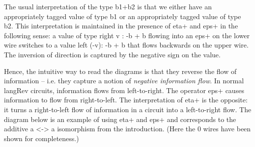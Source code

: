 \documentclass[preprint]{sigplanconf}
\begin{document}
The usual interpretation of the type {{b1+b2}} is that we either have an
appropriately tagged value of type {{b1}} or an appropriately tagged value of
type {{b2}}. This interpretation is maintained in the presence of {{eta+}}
and {{eps+}} in the following sense: a value of type {{right v : -b + b}}
flowing into an {{eps+}} on the lower wire switches to a value 
{{left (-v): -b + b}} that flows backwards on the upper wire. The inversion of
direction is captured by the negative sign on the value. 

\begin{multicols}{2}
\begin{center}
\end{center}
  
\begin{center}
\end{center}  
\end{multicols}

Hence, the intuitive way to read the diagrams is that they reverse the
flow of information -- i.e. they capture a notion of \emph{negative
  information flow}. In normal {{langRev}} circuits, information flows
from left-to-right. The operator {{eps+}} causes information to flow
from right-to-left.  The interpretation of {{eta+}} is the opposite:
it turns a right-to-left flow of information in a circuit into a
left-to-right flow.  The diagram below is an example of using {{eta+}}
and {{eps+}} and corresponds to the additive {{a <-> a}} isomorphism
from the introduction. (Here the {{0}} wires have been shown for
completeness.)
\begin{center}
\end{center}
\end{document}
